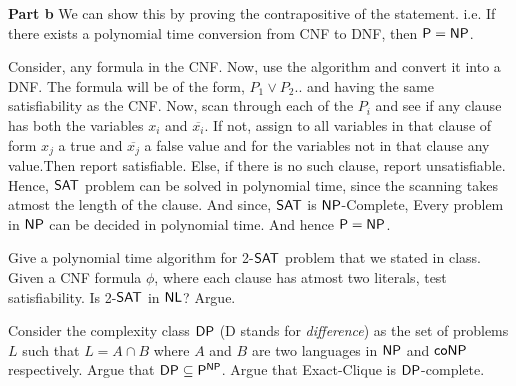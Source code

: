 \documentclass[12pt]{exam}
\begin{document}
\begin{questions}
\begin{solution}
\textbf{Part b} \newline
We can show this by proving the contrapositive of the statement. i.e. If there exists a polynomial time conversion from {\sc CNF} to {\sc DNF}, then ${\mathsf{P}} = {\mathsf{NP}}$.
\newline

Consider, any formula in the {\sc CNF}. Now, use the algorithm and convert it into a {\sc DNF}. The formula will be of the form, $P_{1} \vee P_{2} ..$
and having the same satisfiability as the {\sc CNF}. Now, scan through each of the $P_{i}$ and see if any clause has both the variables $x_{i}$ and $\overline{x_{i}}$.
If not, assign to all variables in that clause of form $x_{j}$ a true and $\overline{x_{j}}$ a false value and for the variables not in that clause any value.Then report satisfiable. Else, if there is no such clause, report unsatisfiable. \newline
Hence, ${\mathsf{SAT}}$ problem can be solved in polynomial time, since the scanning takes atmost the length of the clause. And since, ${\mathsf{SAT}}$ is ${\mathsf{NP}}$-Complete,
Every problem in ${\mathsf{NP}}$ can be decided in polynomial time. And hence ${\mathsf{P}} = {\mathsf{NP}}$.

\end{solution}


\question
Give a polynomial time algorithm for 2-${\mathsf{SAT}}$ problem that we stated in class. Given a CNF formula $\phi$, where each clause has atmost two literals, test satisfiability. Is 2-${\mathsf{SAT}}$ in ${\mathsf{NL}}$? Argue.

\question
Consider the complexity class ${\mathsf{DP}}$ ({\sc D} stands for \textit{difference}) as the set of problems $L$ such that $L = A \cap B$ where $A$ and $B$ are two languages in ${\mathsf{NP}}$ and ${\mathsf{co}}{\mathsf{NP}}$ respectively. Argue that ${\mathsf{DP}} \subseteq {\ensuremath{\mathsf{P}}}^{{\mathsf{NP}}}$. Argue that {\sc Exact-Clique} is ${\mathsf{DP}}$-complete.


\end{questions}
\end{document}
